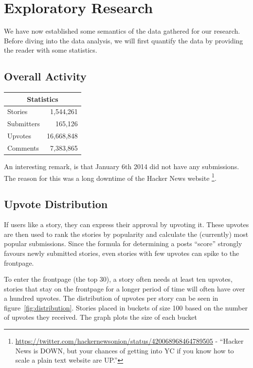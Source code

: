 \section{Exploratory Research}
\label{sec:exploratory}
We have now established some semantics of the data gathered for our research. Before diving into the data analysis, we will first quantify the data by providing the reader with some statistics.

\subsection{Overall Activity}

\begin{center}
    \begin{tabular}{|l|r|}
        \hline
        \multicolumn{2}{|c|}{Statistics} \\
        \hline
         Stories & 1,544,261 \\ 
         Submitters & 165,126 \\ 
         Upvotes & 16,668,848 \\ 
         Comments & 7,383,865 \\
         \hline
    \end{tabular}
\end{center}

An interesting remark, is that January 6th 2014 did not have any submissions. The reason for this was a long downtime of the Hacker News website
\footnote{\url{https://twitter.com/hackernewsonion/status/420068968464789505} - ``Hacker News is DOWN, but your chances of getting into YC if you know how to scale a plain text website are UP.''}.

\subsection{Upvote Distribution}
If users like a story, they can express their approval by upvoting it. These upvotes are then used to rank the stories by popularity and calculate the (currently) most popular submissions. Since the formula for determining a posts ``score'' strongly favours newly submitted stories, even stories with few upvotes can spike to the frontpage.

To enter the frontpage (the top 30), a story often needs at least ten upvotes, stories that stay on the frontpage for a longer period of time will often have over a hundred upvotes. The distribution of upvotes per story can be seen in figure~\ref{fig:distribution}. Stories placed in buckets of size 100 based on the number of upvotes they received. The graph plots the size of each bucket

